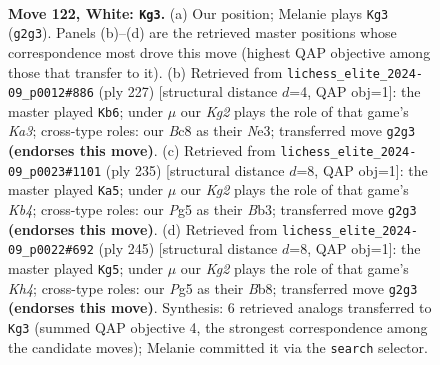 \documentclass[11pt]{article}
\begin{document}
\clearpage

\begin{figure}[p]\centering
\begin{subfigure}{0.46\textwidth}\centering
\resizebox{\linewidth}{!}{%
\newchessgame
\chessboard[
  setfen={2B5/6k1/8/6PP/1n6/8/6K1/8 w - - 13 122},
  showmover=false,
  pgfstyle=straightmove, color=movearrow, markmove={g2-g3}
]}
\caption{}
\end{subfigure}\hfill
\begin{subfigure}{0.46\textwidth}\centering
\resizebox{\linewidth}{!}{%
\newchessgame
\chessboard[
  setfen={8/8/k2N4/2p5/p7/2K1n3/8/8 b - - 5 114},
  showmover=false,
  pgfstyle=straightmove, color=movearrow, markmove={a6-b6}
]}
\caption{}
\end{subfigure}
\\[4pt]
\begin{subfigure}{0.46\textwidth}\centering
\resizebox{\linewidth}{!}{%
\newchessgame
\chessboard[
  setfen={8/8/8/1k6/8/pb6/8/1K6 b - - 85 118},
  showmover=false,
  pgfstyle=straightmove, color=movearrow, markmove={b5-a5}
]}
\caption{}
\end{subfigure}\hfill
\begin{subfigure}{0.46\textwidth}\centering
\resizebox{\linewidth}{!}{%
\newchessgame
\chessboard[
  setfen={1b6/8/8/7k/8/7p/8/7K b - - 17 123},
  showmover=false,
  pgfstyle=straightmove, color=movearrow, markmove={h5-g5}
]}
\caption{}
\end{subfigure}
\caption{\textbf{Move 122, White: \texttt{Kg3}.} (a) Our position; Melanie plays \texttt{Kg3} (\texttt{g2g3}). Panels (b)--(d) are the retrieved master positions whose correspondence most drove this move (highest QAP objective among those that transfer to it). (b) Retrieved from \texttt{lichess\_elite\_2024-09\_p0012\#886} (ply 227) [structural distance $d$=4, QAP obj=1]: the master played \texttt{Kb6}; under $\mu$ our \emph{Kg2} plays the role of that game's \emph{Ka3}; cross-type roles: our \emph{B}c8 as their \emph{N}e3; transferred move \texttt{g2g3} \textbf{(endorses this move)}. (c) Retrieved from \texttt{lichess\_elite\_2024-09\_p0023\#1101} (ply 235) [structural distance $d$=8, QAP obj=1]: the master played \texttt{Ka5}; under $\mu$ our \emph{Kg2} plays the role of that game's \emph{Kb4}; cross-type roles: our \emph{P}g5 as their \emph{B}b3; transferred move \texttt{g2g3} \textbf{(endorses this move)}. (d) Retrieved from \texttt{lichess\_elite\_2024-09\_p0022\#692} (ply 245) [structural distance $d$=8, QAP obj=1]: the master played \texttt{Kg5}; under $\mu$ our \emph{Kg2} plays the role of that game's \emph{Kh4}; cross-type roles: our \emph{P}g5 as their \emph{B}b8; transferred move \texttt{g2g3} \textbf{(endorses this move)}. Synthesis: 6 retrieved analogs transferred to \texttt{Kg3} (summed QAP objective 4, the strongest correspondence among the candidate moves); Melanie committed it via the \texttt{search} selector.}
\label{fig:thought-m242}
\end{figure}
\end{document}
